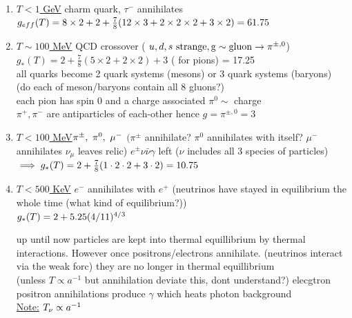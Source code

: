 \documentclass[12pt]{amsart}
\begin{document}
\begin{enumerate}
\item \underline{$T< 1$ GeV} charm quark, $\tau^-$ annihilates\\
$g_{eff}(T) = 8\times2 + 2 + \frac{7}{8} ( 12 \times 3 + 2 \times2\times2 + 3 \times 2 ) = 61.75\\$
\item \underline{$T \sim 100$ MeV} QCD crossover ( $u,d, s~\rm{strange},g\sim \rm{gluon} \rightarrow \pi^{\pm, 0}$)\\
$g_*(T) = 2 + \frac{7}{8} (5 \times 2 + 2 \times 2) + 3$ ( for pions) = 17.25\\
all quarks become 2 quark systems (mesons) or 3 quark systems (baryons)\\
(do each of meson/baryons contain all 8 gluons?)\\
each pion has spin 0 and a charge associated $\pi^0 \sim$ charge\\
$\pi^{+}, \pi^-$ are antiparticles of each-other hence $g={\pi^{\pm,0}} = 3$\\
\item \underline{$T< 100$ MeV}$ \pi^{\pm},\,\, \pi^0,\,\, \mu^-\\$
$(\pi^{\pm}$ annihilate? $\pi^0$ annihilates with itself? $\mu^-$ annihilates $\nu_{\mu}$ leaves relic) $e^{\pm} \nu \bar{\nu} \gamma$ left ($\nu$ includes all 3 species of particles)\\
$\implies g_*(T) = 2 + \frac{7}{8} (1 \cdot 2 \cdot 2 + 3 \cdot 2)= 10.75\\$
\item \underline{$T< 500$ KeV} $e^-$ annihilates with $e^+$ (neutrinos have stayed in equilibrium the whole time (what kind of equilibrium?))\\
$g_*(T) = 2 + 5.25 (4/11)^{4/3}\\$


\hdashrule[0.5ex][c]{\linewidth}{0.5pt}{1.5mm}


up until now particles are kept into thermal equillibrium by thermal interactions. However once positrons/electrons annihilate. (neutrinos interact via the weak forc) they are no longer in thermal equillibrium\\
(unless $T \propto a^{-1}$ but annihilation deviate this, dont understand?) elecgtron positron annihilations produce $\gamma$ which heats photon background\\
\underline{Note:} $T_{\nu} \propto a^{-1}\\$


\hdashrule[0.5ex][c]{\linewidth}{0.5pt}{1.5mm}



\end{enumerate}
\end{document}
